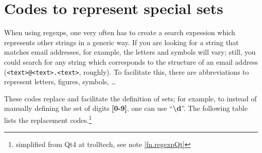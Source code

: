 \section{Codes to represent special sets}

When using regexps, one very often has to create a search expession which represents other strings in a generic way. If you are looking for a string that matches email addresses, for example, the letters and symbols will vary; still, you could search for any string which corresponds to the structure of an email address (\texttt{<text>@<text>.<text>}, roughly). To facilitate this, there are abbreviations to represent letters, figures, symbols, \dots 

These codes replace and facilitate the definition of sets; for example, to instead of manually defining the set of digits \textbf{[0-9]}, one can use ``\textbf{\textbackslash{}d}''. The following table lists the replacement codes.\footnote{simplified from Qt4 at trolltech, see note \label{trollnext}\ref{fn.regexpQt}}
\smallskip

